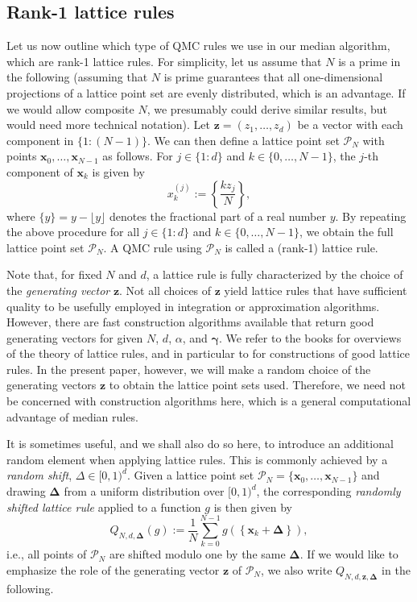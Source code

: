 \documentclass[a4paper,11pt]{article}
\newcommand{\bsx}{\boldsymbol{x}}
\newcommand{\bsz}{\boldsymbol{z}}
\newcommand{\bsgamma}{\boldsymbol{\gamma}}
\newcommand{\bsDelta}{\boldsymbol{\Delta}}
\newcommand{\Pcal}{\mathcal{P}}
\begin{document}
\subsection{Rank-1 lattice rules}
Let us now outline which type of QMC rules we use in our median algorithm, which are rank-1 lattice rules. For simplicity, let us assume that $N$ is a prime in the following (assuming that $N$ is prime guarantees that all one-dimensional projections of a lattice point set are evenly distributed, which is an advantage. If we would allow composite $N$, we presumably could derive similar results, but would need more technical notation). Let $\bsz=(z_1,\ldots,z_d)$ be a 
vector with each component in $\{1{:}(N-1)\}$. We can then define a 
lattice point set $\Pcal_N$ with points $\bsx_0,\ldots,\bsx_{N-1}$ as follows. For $j\in\{1{:}d\}$ and $k\in\{0,\ldots,N-1\}$, the $j$-th component of $\bsx_k$ is given by
\[
x_k^{(j)}:=\left\{\frac{k z_j}{N}\right\},
\]
where $\{y\}=y-\lfloor y \rfloor$ denotes the fractional part of a real number $y$. By repeating the above procedure for all $j\in\{1{:}d\}$ and $k\in\{0,\ldots,N-1\}$, we obtain the full lattice point set $\Pcal_N$. A QMC rule using $\Pcal_N$ is called a (rank-1) lattice rule. 

Note that, for fixed $N$ and $d$, a lattice rule is fully characterized by the choice of the \textit{generating vector} $\bsz$. Not all choices of $\bsz$ yield lattice rules that have sufficient quality to be usefully employed in integration or approximation algorithms. However, there are fast construction algorithms available that return good generating vectors for given $N$, $d$, $\alpha$, and $\bsgamma$. We refer to the books \cite{dick2022lattice, sloan1994lattice} for overviews of the theory of lattice rules, and in particular to \cite[Chapters 3 and 4]{dick2022lattice} for constructions of good lattice rules. In the present paper, however, we will make a random choice of the generating vectors $\bsz$ to obtain the lattice point sets used. Therefore, we need not be concerned with construction algorithms here, which is a general computational advantage of median rules. 

It is sometimes useful, and we shall also do so here, to introduce an additional random element when applying lattice rules. This is commonly achieved by a \emph{random shift}, $\Delta\in [0,1)^d$. Given a lattice point set $\Pcal_N=\{\bsx_0,\ldots,\bsx_{N-1}\}$ and drawing $\bsDelta$ from a uniform distribution over $[0,1)^d$, the corresponding \emph{randomly shifted lattice rule} applied to a function $g$ is then given by 
\[
   Q_{N,d,\bsDelta}(g):=\frac{1}{N}\sum_{k=0}^{N-1}g \left(\left\{\bsx_k + \bsDelta\right\}\right),
\]
i.e., all points of $\Pcal_N$ are shifted modulo one by the same $\bsDelta$.
If we would like to emphasize the role of the generating vector $\bsz$ of $\Pcal_N$, we also write $Q_{N,d,\bsz,\bsDelta}$ in the following. 
\end{document}
